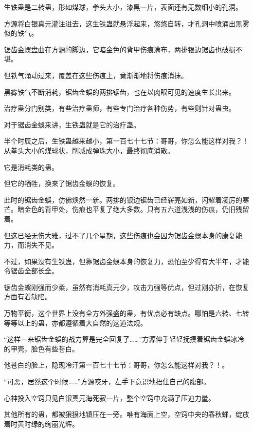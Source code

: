 
\begin{this_body}

生铁蛊是二转蛊，形如煤球，拳头大小，漆黑一片，表面还有无数细小的孔洞。

方源将白银真元灌注进去，这生铁蛊就悬浮起来，悠悠自转，才孔洞中喷涌出黑雾似的铁气。

锯齿金蜈盘曲在方源的脚边，它暗金色的背甲伤痕满布，两排银边锯齿也破损不堪。

但铁气涌动过来，覆盖在这些伤痕上，竟渐渐地将伤痕消抹。

黑雾铁气不断消耗，锯齿金蜈的两排锯齿，也在以肉眼可见的速度生长出来。

治疗蛊分门别类，有些治疗蛊师，有些专门治疗各种伤势，有些则针对蛊虫。

对于锯齿金蜈来讲，生铁蛊就是它的治疗蛊。

半个时辰之后，生铁蛊越来越小，第一百七十七节：哥哥，你怎么能这样对我？！从拳头大小的煤球状，削减成弹珠大小，最终彻底消散。

它是消耗类的蛊。

但它的牺牲，换来了锯齿金蜈的恢复。

此时的锯齿金蜈，仿佛焕然一新。两排的银边锯齿已经崭亮如新，闪耀着凌厉的寒芒。暗金色的背甲处，伤痕也平复了绝大多数。只有五六道浅浅的伤痕，仍旧残留着。

但这已经无伤大雅，过不了几个星期，这些伤痕也会因为锯齿金蜈本身的康复能力，而消失不见。

不过，如果没有生铁蛊，但靠锯齿金蜈本身的恢复力，恐怕至少得有大半年，才能令锯齿全部长全。

锯齿金蜈刚强而少柔，虽然有消耗真元少，攻击力强等优点，但过刚亦折，在恢复方面有着缺陷。

万物平衡，这个世界上没有全方外强盛的蛊，有优点必有缺点。哪怕是六转、七转等等以上的蛊，亦都遵循着大自然的这道法规。

“这样一来锯齿金蜈的战力算是完全回复了……”方源伸手轻轻抚摸着锯齿金蜈冰冷的甲壳，脸色有些苍白。

他苍白的脸上，隐现冷汗第一百七十七节：哥哥，你怎么能这样对我？！。

“可恶，居然这个时候……”方源咬牙，左手下意识地捂住自己的腹部。

心神投入空窍只见白银真元海死寂一片，整个空窍中充满了压迫力量。

其他所有的蛊，都被狠狠地镇压在一旁。唯有海面上空，空窍中央的春秋蝉，绽放着时黄时绿的绚丽光辉。


\end{this_body}
